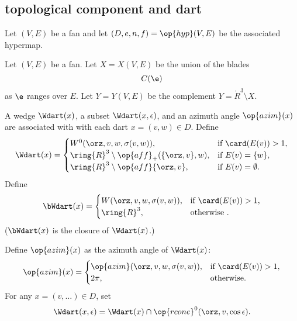 \subsection{topological component and dart}

Let $(V,E)$ be a fan and let $(D,e,n,f) = \op{hyp}(V,E)$
be the associated hypermap.  
%
%
%

\begin{definition}[X,~Y]\label{def:XY}
Let $(V,E)$ be a fan.  Let $X=X(V,E)$ be the union of the
blades
   $$C(\e)$$
as $\e$ ranges over $E$.  Let $Y=Y(V,E)$ be the complement
$Y = \ring{R}^3\setminus X$.
%
%
\end{definition}


A wedge $\Wdart(x)$, a subset $\Wdart(x,\epsilon)$,
and an azimuth angle $\op{azim}(x)$ are associated with
with each dart $x=(v,w)\in D$.  Define 
%
%
%
%
%
%
$$
\Wdart(x)=
\begin{cases} 
W^0(\orz,v,w,\sigma(v,w)),&\text{if }\card(E(v))>1,\\
\ring{R}^3\setminus \op{aff}_+(\{\orz,v\},w),&\text{if } E(v) = \{w\},\\
\ring{R}^3\setminus \op{aff}\{\orz,v\},&\text{if } E(v) = \emptyset.\\
\end{cases}
$$
Define
$$
\bWdart(x) = 
\begin{cases} 
W(\orz,v,w,\sigma(v,w)),&\text{if }\card(E(v))>1,\\
\ring{R}^3,&\text{otherwise }.\\
\end{cases}
$$
%
($\bWdart(x)$ is the closure of $\Wdart(x)$.)


Define $\op{azim}(x)$ as the azimuth angle of $\Wdart(x)$:
%
$$
\op{azim}(x)=\begin{cases}
\op{azim}(\orz,v,w,\sigma(v,w)), &\text{if } \card(E(v)) > 1,\\
2\pi, & \text{otherwise.}\\
\end{cases}
$$
For any $x = (v,\ldots)\in D$, set
    $$
    \Wdart(x,\epsilon) = \Wdart(x) \cap \op{rcone}^0(\orz,v,\cos\epsilon).
    $$

